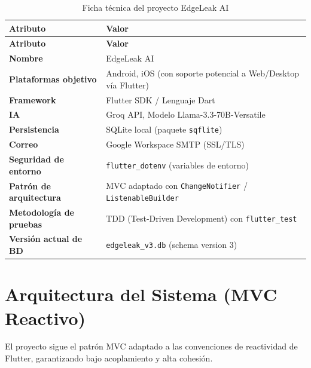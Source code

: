 \documentclass[12pt,a4paper]{article}
\begin{document}
\begin{longtable}{>{\bfseries}p{4cm} p{9.5cm}}
\caption{Ficha técnica del proyecto EdgeLeak AI} \label{tab:ficha-tecnica} \\
\toprule
\textbf{Atributo} & \textbf{Valor} \\
\midrule
\endfirsthead
\toprule
\textbf{Atributo} & \textbf{Valor} \\
\midrule
\endhead
\bottomrule
\endlastfoot
Nombre & EdgeLeak AI \\
Plataformas objetivo & Android, iOS (con soporte potencial a Web/Desktop vía Flutter) \\
Framework & Flutter SDK / Lenguaje Dart \\
IA & Groq API, Modelo Llama-3.3-70B-Versatile \\
Persistencia & SQLite local (paquete \texttt{sqflite}) \\
Correo & Google Workspace SMTP (SSL/TLS) \\
Seguridad de entorno & \texttt{flutter\_dotenv} (variables de entorno) \\
Patrón de arquitectura & MVC adaptado con \texttt{ChangeNotifier} / \texttt{ListenableBuilder} \\
Metodología de pruebas & TDD (Test-Driven Development) con \texttt{flutter\_test} \\
Versión actual de BD & \texttt{edgeleak\_v3.db} (schema version 3) \\
\end{longtable}

\section{Arquitectura del Sistema (MVC Reactivo)}

El proyecto sigue el patrón MVC adaptado a las convenciones de reactividad de Flutter,
garantizando bajo acoplamiento y alta cohesión.
\end{document}
